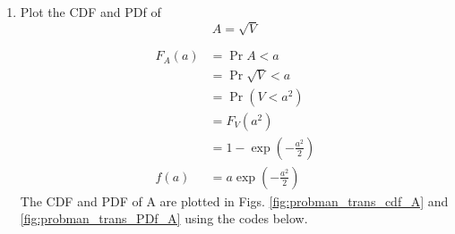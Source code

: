 \documentclass[10pt, a4paper]{article}
\begin{document}
\begin{enumerate}
\begin{center}
\end{center}





%
%
\item
\label{ch3_raleigh_sim}
Plot the CDF and PDf of
%
\begin{equation}
A = \sqrt{V}
\end{equation}

$$
\begin{aligned}
F_A(a) & =\Pr{A<a} \\
& =\Pr{\sqrt{V}<a} \\
& =\Pr{\left(V<a^2\right)} \\
& =F_V\left(a^2\right) \\
& =1-\exp \left(-\frac{a^2}{2}\right)\\
f(a)&=a \exp \left(-\frac{a^2}{2}\right)
\end{aligned}
$$
 The CDF and PDF of A are plotted in Figs. \ref{fig:probman_trans_cdf_A} and \ref{fig:probman_trans_PDf_A}
using the codes below.


\end{enumerate}
\end{document}
